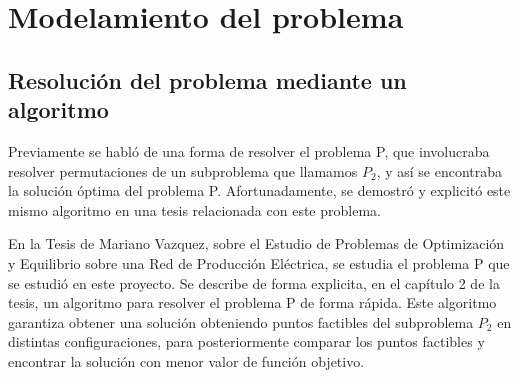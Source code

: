 \documentclass[12pt,twoside]{article}
\begin{document}
	\begin{center}
	\end{center}
	
	
	
	
	\newpage
	
	\section{Modelamiento del problema}
	\subsection{Resoluci\'on del problema mediante un algoritmo}

	\hspace{1cm} Previamente se habl\'o de una forma de resolver el problema P, que involucraba resolver permutaciones de un subproblema que llamamos \(P_2\), y as\'i se encontraba la soluci\'on \'optima del problema P. Afortunadamente, se demostr\'o y explicit\'o este mismo algoritmo en una tesis relacionada con este problema.
	
	\hspace{1cm} En la Tesis de Mariano Vazquez, sobre el Estudio de Problemas de Optimizaci\'on y Equilibrio sobre una Red de Producci\'on El\'ectrica, se estudia el problema P que se estudi\'o en este proyecto. Se describe de forma explicita, en el cap\'itulo 2 de la tesis, un algoritmo para resolver el problema P de forma r\'apida. Este algoritmo garantiza obtener una soluci\'on obteniendo puntos factibles del subproblema \(P_2\) en distintas configuraciones, para posteriormente comparar los puntos factibles y encontrar la soluci\'on con menor valor de funci\'on objetivo. 
	
\end{document}

